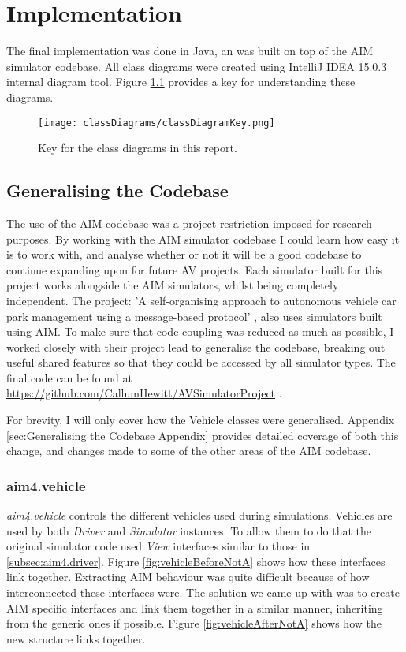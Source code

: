 \chapter{Implementation}
\label{cha:Implementation}
The final implementation was done in Java, an was built on top of the AIM simulator codebase. All class diagrams were created using IntelliJ IDEA 15.0.3 internal diagram tool. Figure \ref{fig:classDiagramKey} provides a key for understanding these diagrams.

\begin{figure}[htb]
\texttt{[image: classDiagrams/classDiagramKey.png]}
\caption{Key for the class diagrams in this report.}
\label{fig:classDiagramKey}
\end{figure}

\section{Generalising the Codebase}
\label{sec:Generalising the Codebase}
The use of the AIM codebase was a project restriction imposed for research purposes. By working with the AIM simulator codebase I could learn how easy it is to work with, and analyse whether or not it will be a good codebase to continue expanding upon for future AV projects. Each simulator built for this project works alongside the AIM simulators, whilst being completely independent. The project: 'A self-organising approach to autonomous vehicle car park management using a message-based protocol' \citep{Milligan2017}, also uses simulators built using AIM. To make sure that code coupling was reduced as much as possible, I worked closely with their project lead to generalise the codebase, breaking out useful shared features so that they could be accessed by all simulator types. The final code can be found at \url{https://github.com/CallumHewitt/AVSimulatorProject} \citep{Codebase}.

For brevity, I will only cover how the Vehicle classes were generalised. Appendix \ref{sec:Generalising the Codebase Appendix} provides detailed coverage of both this change, and changes made to some of the other areas of the AIM codebase.

\subsection{aim4.vehicle}
\label{subsec:aim4.vehicle}
\emph{aim4.vehicle} controls the different vehicles used during simulations. Vehicles are used by both \emph{Driver} and \emph{Simulator} instances. To allow them to do that the original simulator code used \emph{View} interfaces similar to those in \ref{subsec:aim4.driver}. Figure \ref{fig:vehicleBeforeNotA} shows how these interfaces link together. Extracting AIM behaviour was quite difficult because of how interconnected these interfaces were. The solution we came up with was to create AIM specific interfaces and link them together in a similar manner, inheriting from the generic ones if possible. Figure \ref{fig:vehicleAfterNotA} shows how the new structure links together.

